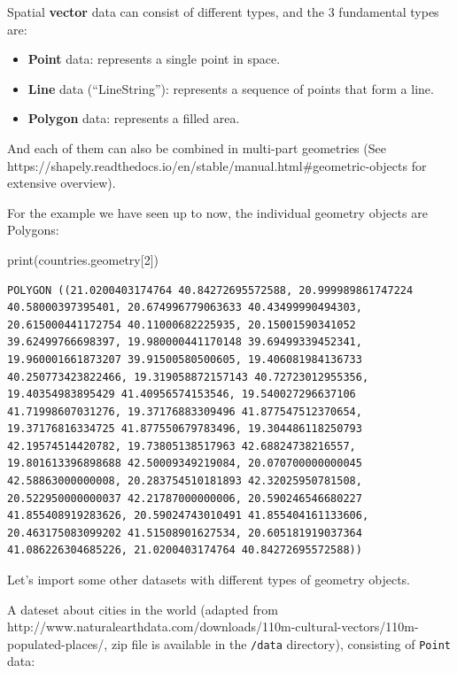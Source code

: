 \documentclass[
  letterpaper,
  DIV=11,
  numbers=noendperiod]{scrreprt}
\newenvironment{Shaded}{\begin{snugshade}}{\end{snugshade}}
\newcommand{\BuiltInTok}[1]{\textcolor[rgb]{0.00,0.23,0.31}{#1}}
\newcommand{\DecValTok}[1]{\textcolor[rgb]{0.68,0.00,0.00}{#1}}
\newcommand{\NormalTok}[1]{\textcolor[rgb]{0.00,0.23,0.31}{#1}}
\providecommand{\tightlist}{%
  \setlength{\itemsep}{0pt}\setlength{\parskip}{0pt}}\usepackage{longtable,booktabs,array}
\begin{document}
Spatial \textbf{vector} data can consist of different types, and the 3
fundamental types are:

\begin{itemize}
\tightlist
\item
  \textbf{Point} data: represents a single point in space.
\item
  \textbf{Line} data (``LineString''): represents a sequence of points
  that form a line.
\item
  \textbf{Polygon} data: represents a filled area.
\end{itemize}

And each of them can also be combined in multi-part geometries (See
https://shapely.readthedocs.io/en/stable/manual.html\#geometric-objects
for extensive overview).

For the example we have seen up to now, the individual geometry objects
are Polygons:

\begin{Shaded}
\begin{Highlighting}[]
\BuiltInTok{print}\NormalTok{(countries.geometry[}\DecValTok{2}\NormalTok{])}
\end{Highlighting}
\end{Shaded}

\begin{verbatim}
POLYGON ((21.0200403174764 40.84272695572588, 20.999989861747224 40.58000397395401, 20.674996779063633 40.43499990494303, 20.615000441172754 40.11000682225935, 20.15001590341052 39.62499766698397, 19.980000441170148 39.69499339452341, 19.960001661873207 39.91500580500605, 19.406081984136733 40.250773423822466, 19.319058872157143 40.72723012955356, 19.40354983895429 41.40956574153546, 19.540027296637106 41.71998607031276, 19.37176883309496 41.877547512370654, 19.37176816334725 41.877550679783496, 19.304486118250793 42.19574514420782, 19.73805138517963 42.68824738216557, 19.801613396898688 42.50009349219084, 20.070700000000045 42.58863000000008, 20.283754510181893 42.32025950781508, 20.522950000000037 42.21787000000006, 20.590246546680227 41.855408919283626, 20.59024743010491 41.855404161133606, 20.463175083099202 41.51508901627534, 20.605181919037364 41.086226304685226, 21.0200403174764 40.84272695572588))
\end{verbatim}

Let's import some other datasets with different types of geometry
objects.

A dateset about cities in the world (adapted from
http://www.naturalearthdata.com/downloads/110m-cultural-vectors/110m-populated-places/,
zip file is available in the \texttt{/data} directory), consisting of
\texttt{Point} data:
\end{document}
